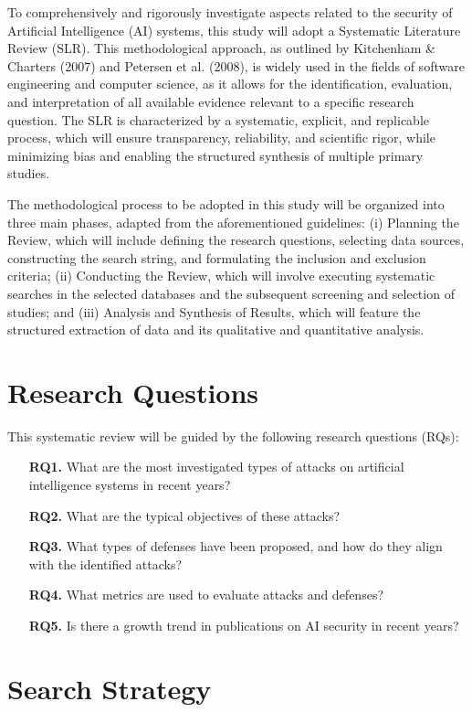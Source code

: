 \documentclass[twoside,brazilian,english]{UNISINOSmonografia}
\begin{document}
To comprehensively and rigorously investigate aspects related to the security of Artificial Intelligence (AI) systems, this study will adopt a Systematic Literature Review (SLR). This methodological approach, as outlined by Kitchenham \& Charters (2007) and Petersen et al. (2008), is widely used in the fields of software engineering and computer science, as it allows for the identification, evaluation, and interpretation of all available evidence relevant to a specific research question. The SLR is characterized by a systematic, explicit, and replicable process, which will ensure transparency, reliability, and scientific rigor, while minimizing bias and enabling the structured synthesis of multiple primary studies.

The methodological process to be adopted in this study will be organized into three main phases, adapted from the aforementioned guidelines: (i) Planning the Review, which will include defining the research questions, selecting data sources, constructing the search string, and formulating the inclusion and exclusion criteria; (ii) Conducting the Review, which will involve executing systematic searches in the selected databases and the subsequent screening and selection of studies; and (iii) Analysis and Synthesis of Results, which will feature the structured extraction of data and its qualitative and quantitative analysis.

\section{Research Questions}

This systematic review will be guided by the following research questions (RQs):
\begin{itemize}
    \item[\textbf{RQ1.}] What are the most investigated types of attacks on artificial intelligence systems in recent years?
    \item[\textbf{RQ2.}] What are the typical objectives of these attacks?
    \item[\textbf{RQ3.}] What types of defenses have been proposed, and how do they align with the identified attacks?
    \item[\textbf{RQ4.}] What metrics are used to evaluate attacks and defenses?
    \item[\textbf{RQ5.}] Is there a growth trend in publications on AI security in recent years?
\end{itemize}

\section{Search Strategy}
\end{document}
